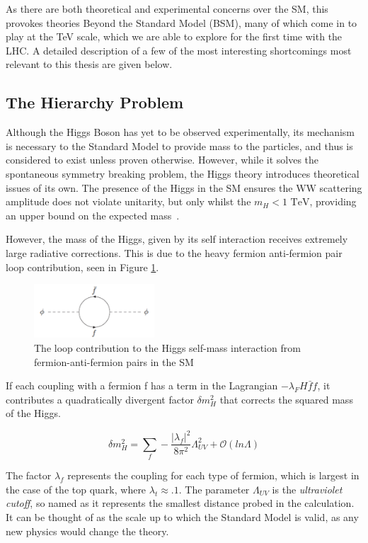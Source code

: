 As there are both theoretical and experimental concerns over the SM, this provokes theories Beyond the Standard Model (BSM), many of which come in to play at the TeV scale, which we are able to explore for the first time with the LHC. A detailed description of a few of the most interesting shortcomings most relevant to this thesis are given below.

\subsection{The Hierarchy Problem}
Although the Higgs Boson has yet to be observed experimentally, its mechanism is necessary to the Standard Model to provide mass to the particles, and thus is considered to exist unless proven otherwise. However, while it solves the spontaneous symmetry breaking problem, the Higgs theory introduces theoretical issues of its own. The presence of the Higgs in the SM ensures the WW scattering amplitude does not violate unitarity, but only whilst the $m_{H} < 1$ $\textrm{TeV}$, providing an upper bound on the expected mass~\cite{WWHMass}. 

However, the mass of the Higgs, given by its self interaction receives extremely large radiative corrections. This is due to the heavy fermion anti-fermion pair loop contribution, seen in Figure \ref{fig:hiloop}. 

\begin{figure}
\centering
\includegraphics[width=0.4\textwidth]{Figures/Theory/higgsself}
\caption{\label{fig:hiloop}The loop contribution to the Higgs self-mass interaction from fermion-anti-fermion pairs in the SM}
\end{figure}

If each coupling with a fermion f has a term in the Lagrangian $-\lambda_{F} H \bar{f}f$, it contributes a quadratically divergent factor $\delta m^{2}_{H}$ that corrects the squared mass of the Higgs. 

\begin{equation}
\delta m^{2}_{H} =\sum_{f} - \frac{|\lambda_{f}|^{2}}{8 \pi^{2}}\Lambda^{2}_{UV} + \mathcal{O}(ln\Lambda)
\label{eqn:HIGGQUAD}
\end{equation}

The factor $\lambda_{f}$  represents the coupling for each type of fermion, which is largest in the case of the top quark, where $\lambda_{t} \approx. 1$. The parameter $\Lambda_{UV}$ is the \textit{ultraviolet cutoff}, so named as it represents the smallest distance probed in the calculation. It can be thought of as the scale up to which the Standard Model is valid, as any new physics would change the theory.


